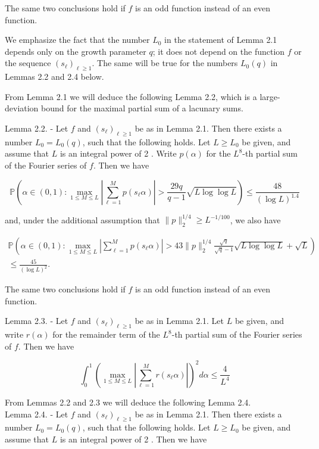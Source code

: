 \documentclass[10pt]{article}
\begin{document}
The same two conclusions hold if $f$ is an odd function instead of an even function.

We emphasize the fact that the number $L_{0}$ in the statement of Lemma 2.1 depends only on the growth parameter $q$; it does not depend on the function $f$ or the sequence $\left(s_{\ell}\right)_{\ell \geqslant 1}$. The same will be true for the numbers $L_{0}(q)$ in Lemmas 2.2 and 2.4 below.

From Lemma 2.1 we will deduce the following Lemma 2.2, which is a large-deviation bound for the maximal partial sum of a lacunary sums.

Lemma 2.2. - Let $f$ and $\left(s_{\ell}\right)_{\ell \geqslant 1}$ be as in Lemma 2.1. Then there exists a number $L_{0}=L_{0}(q)$, such that the following holds. Let $L \geqslant L_{0}$ be given, and assume that $L$ is an integral power of 2 . Write $p(\alpha)$ for the $L^{8}$-th partial sum of the Fourier series of $f$. Then we have

$$
\mathbb{P}\left(\alpha \in(0,1): \max _{1 \leqslant M \leqslant L}\left|\sum_{\ell=1}^{M} p\left(s_{\ell} \alpha\right)\right|>\frac{29 q}{q-1} \sqrt{L \log \log L}\right) \leqslant \frac{48}{(\log L)^{1.4}}
$$

and, under the additional assumption that $\|p\|_{2}^{1 / 4} \geqslant L^{-1 / 100}$, we also have

$$
\begin{array}{r}
\mathbb{P}\left(\alpha \in(0,1): \max _{1 \leqslant M \leqslant L}\left|\sum_{\ell=1}^{M} p\left(s_{\ell} \alpha\right)\right|>43\|p\|_{2}^{1 / 4} \frac{\sqrt{q}}{\sqrt{q}-1} \sqrt{L \log \log L}+\sqrt{L}\right) \\
\leqslant \frac{45}{(\log L)^{2}} .
\end{array}
$$

The same two conclusions hold if $f$ is an odd function instead of an even function.

Lemma 2.3. - Let $f$ and $\left(s_{\ell}\right)_{\ell \geqslant 1}$ be as in Lemma 2.1. Let $L$ be given, and write $r(\alpha)$ for the remainder term of the $L^{8}$-th partial sum of the Fourier series of $f$. Then we have

$$
\int_{0}^{1}\left(\max _{1 \leqslant M \leqslant L}\left|\sum_{\ell=1}^{M} r\left(s_{\ell} \alpha\right)\right|\right)^{2} d \alpha \leqslant \frac{4}{L^{4}}
$$

From Lemmas 2.2 and 2.3 we will deduce the following Lemma 2.4.\\
Lemma 2.4. - Let $f$ and $\left(s_{\ell}\right)_{\ell \geqslant 1}$ be as in Lemma 2.1. Then there exists a number $L_{0}=L_{0}(q)$, such that the following holds. Let $L \geqslant L_{0}$ be given, and assume that $L$ is an integral power of 2 . Then we have
\end{document}
